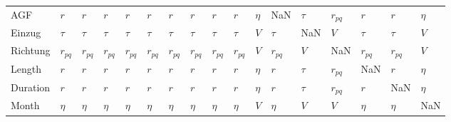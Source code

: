 \begin{tabular}{lllllllllllllllll}
AGF      &       $r$ &       $r$ &       $r$ &       $r$ &       $r$ &       $r$ &       $r$ &       $r$ &       $r$ &  $\eta$ &       NaN &  $\tau$ &  $r_{pq}$ &       $r$ &       $r$ &  $\eta$ \\
Einzug   &    $\tau$ &    $\tau$ &    $\tau$ &    $\tau$ &    $\tau$ &    $\tau$ &    $\tau$ &    $\tau$ &    $\tau$ &     $V$ &    $\tau$ &     NaN &       $V$ &    $\tau$ &    $\tau$ &     $V$ \\
Richtung &  $r_{pq}$ &  $r_{pq}$ &  $r_{pq}$ &  $r_{pq}$ &  $r_{pq}$ &  $r_{pq}$ &  $r_{pq}$ &  $r_{pq}$ &  $r_{pq}$ &     $V$ &  $r_{pq}$ &     $V$ &       NaN &  $r_{pq}$ &  $r_{pq}$ &     $V$ \\
Length   &       $r$ &       $r$ &       $r$ &       $r$ &       $r$ &       $r$ &       $r$ &       $r$ &       $r$ &  $\eta$ &       $r$ &  $\tau$ &  $r_{pq}$ &       NaN &       $r$ &  $\eta$ \\
Duration &       $r$ &       $r$ &       $r$ &       $r$ &       $r$ &       $r$ &       $r$ &       $r$ &       $r$ &  $\eta$ &       $r$ &  $\tau$ &  $r_{pq}$ &       $r$ &       NaN &  $\eta$ \\
Month    &    $\eta$ &    $\eta$ &    $\eta$ &    $\eta$ &    $\eta$ &    $\eta$ &    $\eta$ &    $\eta$ &    $\eta$ &     $V$ &    $\eta$ &     $V$ &       $V$ &    $\eta$ &    $\eta$ &     NaN \\
\bottomrule
\end{tabular}
